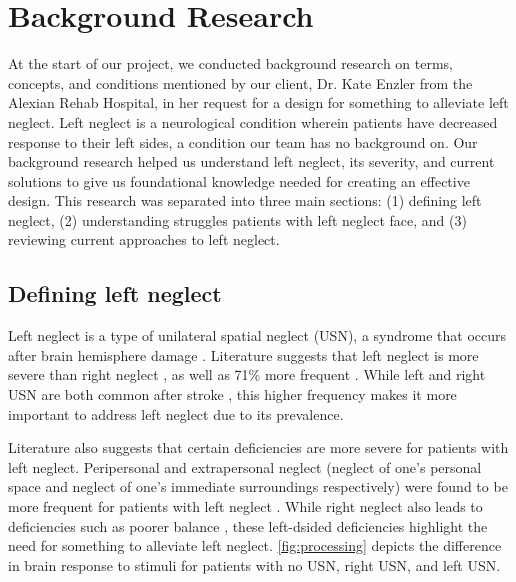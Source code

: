 \chapter{Background Research}
\label{chap:research}

At the start of our project, we conducted background research on terms,
concepts, and conditions mentioned by our client, Dr. Kate Enzler from the
Alexian Rehab Hospital, in her request for a design for something to alleviate
left neglect. Left neglect is a neurological condition wherein patients have
decreased response to their left sides, a condition our team has no background
on. Our background research helped us understand left neglect, its severity,
and current solutions to give us foundational knowledge needed for creating an
effective design. This research was separated into three main sections: (1)
defining left neglect, (2) understanding struggles patients with left neglect
face, and (3) reviewing current approaches to left neglect. 

\section{Defining left neglect}

Left neglect is a type of unilateral spatial neglect (USN), a syndrome that
occurs after brain hemisphere damage
\cite{ten_brink_differences_2017}. Literature suggests that left neglect
is more severe than right neglect \cite{ten_brink_differences_2017}, as well as
71\% more frequent \cite{noauthor_half_2016}. While left and right USN are both
common after stroke \cite{ten_brink_differences_2017}, this higher frequency 
makes it more important to address left neglect due to its prevalence.

Literature also suggests that certain deficiencies are more severe for patients
with left neglect. Peripersonal and extrapersonal neglect (neglect of one’s
personal space and neglect of one’s immediate surroundings respectively) were
found to be more frequent for patients with left neglect
\cite{ten_brink_differences_2017}. While right 
neglect also leads to deficiencies such as poorer balance
\cite{ten_brink_differences_2017}, these 
left-dsided deficiencies highlight the need for something to alleviate left
neglect. \autoref{fig:processing} depicts the difference in brain response to
stimuli for patients with no USN, right USN, and left USN.

